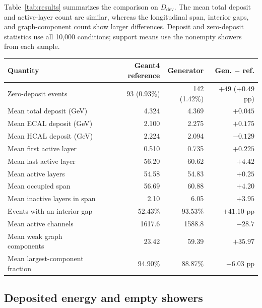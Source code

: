 \documentclass[11pt]{article}
\newcommand{\Ddev}{D_{\mathrm{dev}}}
\begin{document}
Table~\ref{tab:results} summarizes the comparison on $\Ddev$. The mean total deposit and active-layer count are similar, whereas the longitudinal span, interior gaps, and graph-component count show larger differences. Deposit and zero-deposit statistics use all 10,000 conditions; support means use the nonempty showers from each sample.

\begin{center}
\begin{minipage}{\linewidth}
\centering
{}
\label{tab:results}
\small
\begin{tabular}{@{}lrrr@{}}
\toprule
Quantity & Geant4 reference & Generator & Gen. $-$ ref. \\
\midrule
Zero-deposit events & 93 (0.93\%) & 142 (1.42\%) & $+49$ ($+0.49$ pp) \\
Mean total deposit (GeV) & 4.324 & 4.369 & $+0.045$ \\
Mean ECAL deposit (GeV) & 2.100 & 2.275 & $+0.175$ \\
Mean HCAL deposit (GeV) & 2.224 & 2.094 & $-0.129$ \\
\midrule
Mean first active layer & 0.510 & 0.735 & $+0.225$ \\
Mean last active layer & 56.20 & 60.62 & $+4.42$ \\
Mean active layers & 54.58 & 54.83 & $+0.25$ \\
Mean occupied span & 56.69 & 60.88 & $+4.20$ \\
Mean inactive layers in span & 2.10 & 6.05 & $+3.95$ \\
Events with an interior gap & 52.43\% & 93.53\% & $+41.10$ pp \\
Mean active channels & 1617.6 & 1588.8 & $-28.7$ \\
Mean weak graph components & 23.42 & 59.39 & $+35.97$ \\
Mean largest-component fraction & 94.90\% & 88.87\% & $-6.03$ pp \\
\bottomrule
\end{tabular}
\end{minipage}
\end{center}

\subsection{Deposited energy and empty showers}
\end{document}
